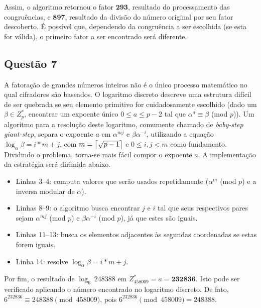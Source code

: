 \documentclass{../sftex/sftex}
\DeclarePairedDelimiter{\ceil}{\lceil}{\rceil}
\begin{document}
Assim, o algoritmo retornou o fator $\textbf{293}$, resultado do processamento
das congruências, e $\textbf{897}$, resultado da divisão do número original
por seu fator descoberto. É possível que, dependendo da congruência a ser
escolhida (se esta for válida), o primeiro fator a ser encontrado será
diferente.

\subsection*{Questão 7}

A fatoração de grandes números inteiros não é o único processo matemático no
qual cifradores são baseados. O logaritmo discreto descreve uma estrutura
difícil de ser quebrada se seu elemento primitivo for cuidadosamente escolhido
(dado um $\beta \in Z^{*}_{p}$, encontrar um expoente único $0 \leq a \leq p-2$
tal que $\alpha^{a} \equiv \beta$ (mod $p$)). Um algoritmo para a resolução
deste logaritmo, comumente chamado de \textit{baby-step giant-step}, separa o
expoente $a$ em $\alpha^{mj}$ e $\beta\alpha^{-i}$, utilizando a equação
$\log_{\alpha}\beta = i * m + j$, com $m = \ceil[\big]{\sqrt{p-1}}$ e
$0 \leq i, j < m$ como fundamento. Dividindo o problema, torna-se mais fácil
compor o expoente $a$. A implementação da estratégia será dirimida abaixo.

\begin{itemize}

    

    \item Linhas 3--4: computa valores que serão usados repetidamente
        ($\alpha^{m}$ (mod $p$) e a inversa modular de $\alpha$).

    \item Linhas 8--9: o algoritmo busca encontrar $j$ e $i$ tal que seus
        respectivos pares sejam $\alpha^{mj}$ (mod $p$) e $\beta\alpha^{-i}$
        (mod $p$), já que estes são iguais.

    \item Linhas 11--13: busca os elementos adjacentes às segundas coordenadas
        se estas forem iguais.

    \item Linha 14: resolve $\log_{\alpha}\beta = i * m + j$.

\end{itemize}

Por fim, o resultado de
$\log_{6} \: 248388$ em $Z^{*}_{458009} = a = \textbf{232836}$. Isto pode ser
verificado aplicando o número encontrado no logaritmo discreto. De fato,
$6^{232836} \equiv 248388 \pmod{458009}$, pois
$6^{232836} \pmod{458009} = 248388$.



\end{document}
